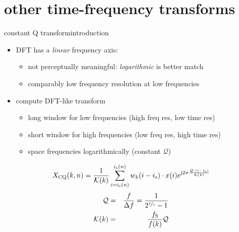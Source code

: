    \section[time-freq]{other time-frequency transforms}
        \begin{frame}{constant Q transform}{introduction}
            \begin{itemize}
                \item<1-> DFT has a \textit{linear} frequency axis:
                    \begin{itemize}
                        \item	not perceptually meaningful: \textit{logarithmic} is better match
                        \item	comparably low frequency resolution at low frequencies
                    \end{itemize}
                \bigskip
                \item<2->[$\Rightarrow$] compute DFT-like transform {\color{gtgold}{at specific frequencies}}
                    \begin{itemize}
                        \item   long window for low frequencies (high freq res, low time res)
                        \item   short window for high frequencies (low freq res, high time res)
                        \item   space frequencies logarithmically (constant $\mathcal{Q}$)
                    \end{itemize}
            \end{itemize}
            \pause
            \begin{equation*}
                X_\mathrm{CQ}(k,n) = \frac{1}{\mathcal{K}(k)}\sum\limits_{i=i_{\mathrm{s}}(n)}^{i_{\mathrm{e}}(n)}{w_k(i-i_{\mathrm{s}})\cdot x(i) {e}^{\mathrm{j}2\pi \frac{\mathcal{Q}\cdot(i-i_{\mathrm{s}})}{\mathcal{K}(k)}}}
            \end{equation*}
            \begin{eqnarray*}
                \mathcal{Q} &=& \frac{f}{\Delta f} = \frac{1}{2^{\nicefrac{1}{c}}-1}\\
                \mathcal{K}(k) &=& \frac{f_{\mathrm{S}}}{f(k)} \mathcal{Q}
            \end{eqnarray*} 
            
        \end{frame}	

